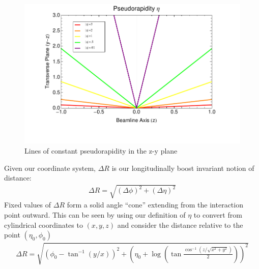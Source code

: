 \begin{figure}
\begin{center}
\includegraphics[width=.6\textwidth]{figures/exp_proj/pseudorapidity}
\end{center}
\caption{Lines of constant pseudorapidity in the z-y plane}
\label{fig:pseudorapidity}
\end{figure}

 Given our coordinate system, $\Delta R$ is our longitudinally boost invariant notion of distance:
\begin{align*}
\Delta R = \sqrt{ (\Delta \phi)^2 + (\Delta \eta)^2}
\end{align*}
Fixed values of $\Delta R$ form a solid angle ``cone'' extending from the interaction point outward. This can be seen by
 using our definition of $\eta$ to convert from cylindrical coordinates to $(x,y,z)$ and consider the distance relative to the point $(\eta_0,\phi_0)$
\begin{align*}
\Delta R = \sqrt{ \left( \phi_0 - \tan^{-1} (y/x) \right )^2 + \left ( \eta_0 + \log \left( \tan \frac{\cos^{-1} (z/\sqrt{x^2+y^2})}{2} \right) \right)^2 }
\end{align*}

